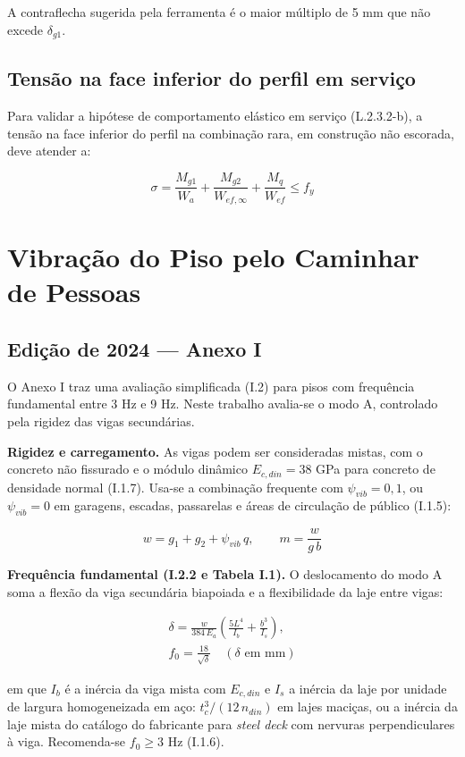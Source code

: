 A contraflecha sugerida pela ferramenta é o maior múltiplo de 5 mm que não excede $\delta_{g1}$.

\subsection{Tensão na face inferior do perfil em serviço}\label{sec:2.8.4}
Para validar a hipótese de comportamento elástico em serviço (L.2.3.2-b), a tensão na face inferior do perfil na combinação rara, em construção não escorada, deve atender a:

\[
  \sigma = \frac{M_{g1}}{W_a} + \frac{M_{g2}}{W_{ef,\infty}} + \frac{M_q}{W_{ef}} \le f_y
\]

\section{Vibração do Piso pelo Caminhar de Pessoas}\label{sec:2.9}

\subsection{Edição de 2024 --- Anexo I}\label{sec:2.9.1}
O Anexo I traz uma avaliação simplificada (I.2) para pisos com frequência fundamental entre 3 Hz e 9 Hz. Neste trabalho avalia-se o modo A, controlado pela rigidez das vigas secundárias.

\textbf{Rigidez e carregamento.} As vigas podem ser consideradas mistas, com o concreto não fissurado e o módulo dinâmico $E_{c,din} = 38$ GPa para concreto de densidade normal (I.1.7). Usa-se a combinação frequente com $\psi_{vib} = 0{,}1$, ou $\psi_{vib} = 0$ em garagens, escadas, passarelas e áreas de circulação de público (I.1.5):

\[
  w = g_1 + g_2 + \psi_{vib}\, q, \qquad m = \frac{w}{g\, b}
\]

\textbf{Frequência fundamental (I.2.2 e Tabela I.1).} O deslocamento do modo A soma a flexão da viga secundária biapoiada e a flexibilidade da laje entre vigas:

\begin{gather*}
  \delta = \frac{w}{384\, E_a}\left(\frac{5 L^4}{I_b} + \frac{b^3}{I_s}\right), \\
  f_0 = \frac{18}{\sqrt{\delta}} \quad (\delta \text{ em mm})
\end{gather*}

em que $I_b$ é a inércia da viga mista com $E_{c,din}$ e $I_s$ a inércia da laje por unidade de largura homogeneizada em aço: $t_c^3/(12\, n_{din})$ em lajes maciças, ou a inércia da laje mista do catálogo do fabricante para \emph{steel deck} com nervuras perpendiculares à viga. Recomenda-se $f_0 \ge 3$ Hz (I.1.6).

